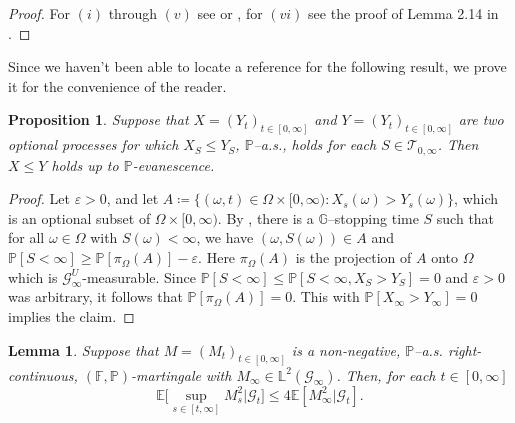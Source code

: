 \documentclass[10pt]{article} %
\newtheorem{lemma}[theorem]{Lemma}
\newtheorem{proposition}[theorem]{Proposition}
\newcommand\cG{\mathcal G}
\newcommand\cT{\mathcal T}
\def \E{\mathbb{E}}
\def \F{\mathbb{F}}
\def \G{\mathbb{G}}
\def \L{\mathbb{L}}
\def \P{\mathbb{P}}
\newcommand{\1}{\mathbf{1}}
\begin{document}
\begin{proof}
	For $(i)$ through $(v)$ see \cite[page 119--120]{dellacherie1982probabilities} or \cite[page 21--22]{he1992semimartingale}, for $(vi)$ see the proof of Lemma 2.14 in \cite{papapantoleon2018existence}.
\end{proof}

Since we haven't been able to locate a reference for the following result, we prove it for the convenience of the reader.

\begin{proposition}\label{prop::optional_ineq}
	Suppose that $X = (Y_t)_{t \in [0,\infty]}$ and $Y = (Y_t)_{t \in [0,\infty]}$ are two optional processes for which $X_S \leq Y_S$, $\P${\rm--a.s.}, holds for each $S \in \cT_{0,\infty}$. Then $X \leq Y$ holds up to $\P$-evanescence.
\end{proposition}

\begin{proof}
	Let $\varepsilon > 0$, and let $A \coloneqq \{(\omega,t) \in \Omega \times [0,\infty) : X_s(\omega) > Y_s(\omega) \}$, which is an optional subset of $\Omega \times [0,\infty)$. By \cite[Theorem IV.84]{ dellacherie1978probabilities}, there is a $\G$--stopping time $S$ such that for all $\omega \in \Omega$ with $S(\omega) < \infty$, we have $(\omega,S(\omega)) \in A $ and $\P[S < \infty] \geq \P[\pi_\Omega(A)] - \varepsilon.$ Here $\pi_\Omega(A)$ is the projection of $A$ onto $\Omega$ which is $\cG^U_\infty$-measurable. Since $\P[S < \infty] \leq \P[S < \infty, X_S > Y_S] = 0$ and $\varepsilon > 0$ was arbitrary, it follows that $\P[\pi_\Omega(A)] = 0$. This with $\P[X_\infty > Y_\infty] = 0$ implies the claim.
\end{proof}


\begin{lemma}\label{lem::cond_doob}
	Suppose that $M = (M_t)_{t \in [0,\infty]}$ is a non-negative, $\P${\rm--a.s.} right-continuous, $(\F,\P)$-martingale with $M_\infty \in \L^2(\cG_\infty)$. Then, for each $t \in [0,\infty]$
	\begin{equation*}
		\E \bigg[ \sup_{s \in [t,\infty]} M^2_s \bigg| \cG_t \bigg] \leq 4 \E[ M^2_\infty | \cG_t ].
	\end{equation*}
\end{lemma}
\end{document}
